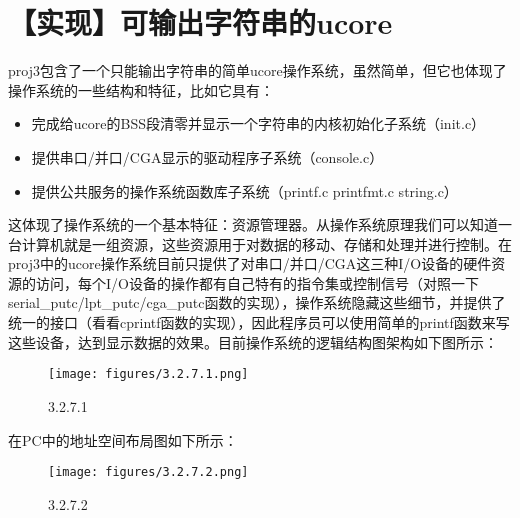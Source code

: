 \section{【实现】可输出字符串的ucore}\label{ux5b9eux73b0ux53efux8f93ux51faux5b57ux7b26ux4e32ux7684ucore}

proj3包含了一个只能输出字符串的简单ucore操作系统，虽然简单，但它也体现了操作系统的一些结构和特征，比如它具有：

\begin{itemize}
\item
  完成给ucore的BSS段清零并显示一个字符串的内核初始化子系统（init.c）
\item
  提供串口/并口/CGA显示的驱动程序子系统（console.c）
\item
  提供公共服务的操作系统函数库子系统（printf.c printfmt.c string.c）
\end{itemize}

这体现了操作系统的一个基本特征：资源管理器。从操作系统原理我们可以知道一台计算机就是一组资源，这些资源用于对数据的移动、存储和处理并进行控制。在proj3中的ucore操作系统目前只提供了对串口/并口/CGA这三种I/O设备的硬件资源的访问，每个I/O设备的操作都有自己特有的指令集或控制信号（对照一下serial\_putc/lpt\_putc/cga\_putc函数的实现），操作系统隐藏这些细节，并提供了统一的接口（看看cprintf函数的实现），因此程序员可以使用简单的printf函数来写这些设备，达到显示数据的效果。目前操作系统的逻辑结构图架构如下图所示：

\begin{figure}[htbp]
\centering
\texttt{[image: figures/3.2.7.1.png]}
\caption{3.2.7.1}
\end{figure}

在PC中的地址空间布局图如下所示：

\begin{figure}[htbp]
\centering
\texttt{[image: figures/3.2.7.2.png]}
\caption{3.2.7.2}
\end{figure}
